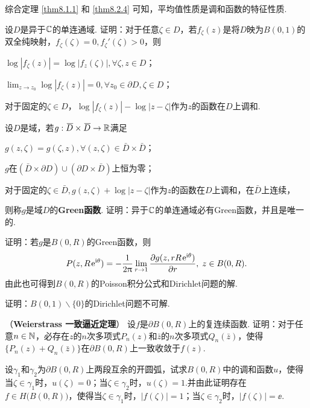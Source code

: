 综合定理 \ref{thm8.1.1} 和 \ref{thm8.2.4} 可知，平均值性质是调和函数的特征性质.
\begin{xiti}\hypertarget{xiti8.2}{}
\item 设$D$是异于$\mathbb C$的单连通域. 证明：对于任意$\zeta\in D$，若$f_\zeta(z)$是将$D$映为$B(0,1)$的双全纯映射，$f_\zeta(\zeta)=0,f_\zeta'(\zeta)>0$，则
\begin{enuma}
  \item $\log|f_\zeta(z)|=\log|f_z(\zeta)|,\forall\zeta,z\in D$；
  \item $\lim_{z\to z_0}\log|f_\zeta(z)|=0,\forall z_0\in\partial D,\zeta\in D$；
  \item 对于固定的$\zeta\in D$，$\log|f_\zeta(z)|-\log|z-\zeta|$作为$z$的函数在$D$上调和.
\end{enuma}
\item 设$D$是域，若$g:{}\mkern2mu\overline{\mkern-2muD}\times {}\mkern2mu\overline{\mkern-2muD}\to\mathbb R$满足
\begin{enuma}
  \item $g(z,\zeta)=g(\zeta,z),\forall (z,\zeta)\in\bar D\times\bar D$；
  \item $g$在$(\bar D\times\partial D)\cup(\partial D\times\bar D)$上恒为零；
  \item 对于固定的$\zeta\in\bar D,g(z,\zeta)+\log|z-\zeta|$作为$z$的函数在$D$上调和，在$\bar D$上连续，
\end{enuma}
则称$g$是域$D$的\textbf{Green函数}. 证明：异于$\mathbb C$的单连通域必有Green函数，并且是唯一的.
\item 证明：若$g$是$B(0,R)$的Green函数，则
\[P(z,R\operatorname{\!\!\;\mathrm e}^{\mathrm i\theta})=-\frac1{2\uppi}\lim_{r\to1}\frac{\partial g(z,rR\operatorname{\!\!\;\mathrm e}^{\mathrm i\theta})}{\partial r}
,\;z\in B(0,R).\]
由此也可得到$B(0,R)$的Poisson积分公式和Dirichlet问题的解.
\item 证明：$B(0,1)\backslash\{0\}$的Dirichlet问题不可解.
\item （\textbf{Weierstrass 一致逼近定理}）
设$f$是$\partial B(0,R)$上的复连续函数. 证明：对于任意$n\in\mathbb N$，必存在$z$的$n$次多项式$P_n(z)$和$\bar z$的$n$次多项式$Q_n(\bar z)$，使得$\{P_n(z)+Q_n(\bar z)\}$在$\partial B(0,R)$上一致收敛于$f(z)$.
\item \hypertarget{xiti8.2.6}{} 设$\gamma_1$和$\gamma_2$为$\partial B(0,R)$上两段互余的开圆弧，试求$B(0,R)$中的调和函数$u$，使得当$\zeta\in\gamma_1$时，$u(\zeta)=0$；当$\zeta\in\gamma_2$时，$u(\zeta)=1$.并由此证明存在$f\in H\big(B(0,R)\big)$，使得当$\zeta\in\gamma_1$时，$|f(\zeta)|=1$；当$\zeta\in\gamma_2$时，$|f(\zeta)|=\ee$.
\end{xiti}


